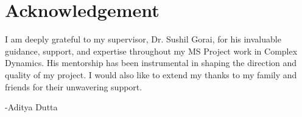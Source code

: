 \section*{Acknowledgement}
I am deeply grateful to my supervisor, Dr. Sushil Gorai, for his invaluable guidance, support, and expertise throughout my MS Project work in Complex Dynamics. His mentorship has been instrumental in shaping the direction and quality of my project. I would also like to extend my thanks to my family and friends for their unwavering support.

\noindent -Aditya Dutta
